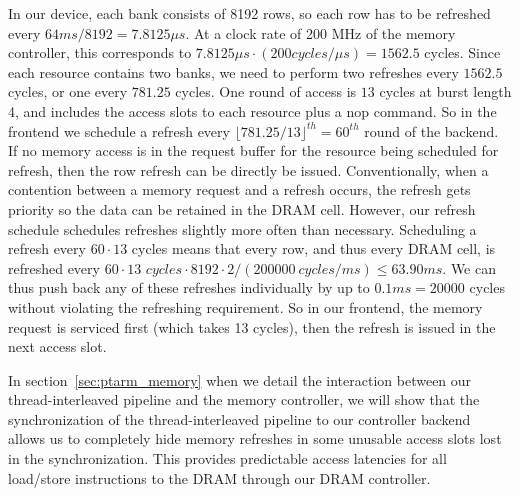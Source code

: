 In our device, each bank consists of 8192 rows, so each row has to be refreshed every $64\textit{ms}/8192=7.8125 {\mu}s$.
At a clock rate of 200 MHz of the memory controller, this corresponds to $7.8125 {\mu}s \cdot (200 \textit{cycles}/{\mu}s) = 1562.5$ cycles.
Since each resource contains two banks, we need to perform two refreshes every $1562.5$ cycles, or one every $781.25$ cycles.
One round of access is $13$ cycles at burst length 4, and includes the access slots to each resource plus a nop command. 
So in the frontend we schedule a refresh every $\lfloor 781.25/13 \rfloor^{th} = 60^{th}$ round of the backend.
If no memory access is in the request buffer for the resource being scheduled for refresh, then the row refresh can be directly be issued. 
Conventionally, when a contention between a memory request and a refresh occurs, the refresh gets priority so the data can be retained in the DRAM cell. 
However, our refresh schedule schedules refreshes slightly more often than necessary.   
Scheduling a refresh every $60 \cdot 13$ cycles means that every row, and thus every DRAM cell, is refreshed every $60\cdot 13 \textit{ cycles}\cdot 8192\cdot 2/(200000~\textit{cycles}/\textit{ms}) \leq 63.90\textit{ms}$.
We can thus push back any of these refreshes individually by up to $0.1\textit{ms} = 20000$ cycles without violating the refreshing requirement.
So in our frontend, the memory request is serviced first (which takes 13 cycles), then the refresh is issued in the next access slot. 

In section~\ref{sec:ptarm_memory} when we detail the interaction between our thread-interleaved pipeline and the memory controller, we will show that the synchronization of the thread-interleaved pipeline to our controller backend allows us to completely hide memory refreshes in some unusable access slots lost in the synchronization.
This provides predictable access latencies for all load/store instructions to the DRAM through our DRAM controller.



